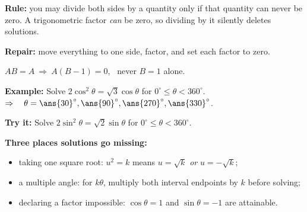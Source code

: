 \documentclass[12pt]{article}
\begin{document}


\begin{formulabox}
\textbf{Rule:} you may divide both sides by a quantity only if that quantity can never be zero. A trigonometric factor \emph{can} be zero, so dividing by it silently deletes solutions.\par
\textbf{Repair:} move everything to one side, factor, and set each factor to zero.\par
$AB = A \ \Longrightarrow\ A(B - 1) = 0$, \ never $B = 1$ alone.
\end{formulabox}

\begin{examplebox}
\textbf{Example:} \quad Solve $2\cos^2\theta = \sqrt{3}\cos\theta$ for $0^\circ \le \theta < 360^\circ$.
$\Rightarrow\quad \theta = \ans{30}^\circ, \ans{90}^\circ, \ans{270}^\circ, \ans{330}^\circ$.
\end{examplebox}

\begin{tryitbox}
\textbf{Try it:} \quad Solve $2\sin^2\theta = \sqrt{2}\sin\theta$ for $0^\circ \le \theta < 360^\circ$.\\[2pt]
\end{tryitbox}


\begin{formulabox}
\textbf{Three places solutions go missing:}\par
\begin{itemize}[leftmargin=0.9cm, itemsep=1pt, topsep=2pt]
  \item taking one square root: $u^2 = k$ means $u = \sqrt{k}$ \emph{or} $u = -\sqrt{k}$;
  \item a multiple angle: for $k\theta$, multiply both interval endpoints by $k$ before solving;
  \item declaring a factor impossible: $\cos\theta = 1$ and $\sin\theta = -1$ are attainable.
\end{itemize}
\end{formulabox}
\end{document}

